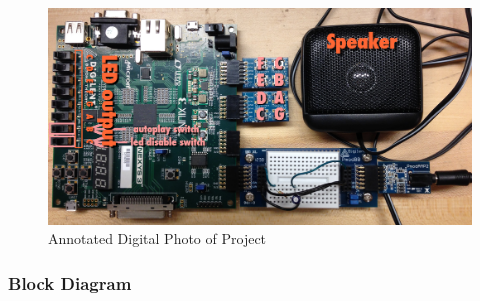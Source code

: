 \documentclass{article}
\begin{document}
	    \begin{figure}[H]
	    	\centering
	    	\includegraphics[width=6.5in]{img/annotated.jpg}
	    	\caption{Annotated Digital Photo of Project}
	    \end{figure}

    \subsubsection{Block Diagram}

\end{document}
